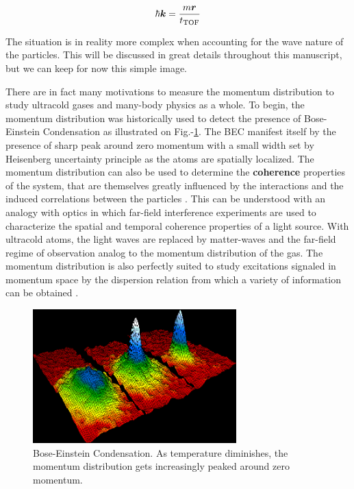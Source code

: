 \begin{equation}
    \hbar \bm{k} = \frac{m \bm{r}}{t_{\rm{TOF}}}
\end{equation}

\noindent The situation is in reality more complex when accounting for the wave nature of the particles. This will be discussed in great details throughout this manuscript, but we can keep for now this simple image.

There are in fact many motivations to measure the momentum distribution to study ultracold gases and many-body physics as a whole. To begin, the momentum distribution was historically \cite{anderson1995observation} used to detect the presence of Bose-Einstein Condensation as illustrated on Fig.-\ref{fig:1st_BEC}. The BEC manifest itself by the presence of sharp peak around zero momentum with a small width set by Heisenberg uncertainty principle as the atoms are spatially localized. The momentum distribution can also be used to determine the \textbf{coherence} properties of the system, that are themselves greatly influenced by the interactions and the induced correlations between the particles \cite{greiner2002quantum}. This can be understood with an analogy with optics in which far-field interference experiments are used to characterize the spatial and temporal coherence properties of a light source. With ultracold atoms, the light waves are replaced by matter-waves and the far-field regime of observation analog to the momentum distribution of the gas. The momentum distribution is also perfectly suited to study excitations signaled in momentum space by the dispersion relation from which a variety of information can be obtained \cite{clement2009exploring,ozeri2005colloquium,sagi2012measurement}.


\begin{figure}
    \centering
    \includegraphics[width=0.7\textwidth]{Fig/Intro/BEC.png}
    \caption[Momentum distribution across Bose-Einstein Condensation]{Bose-Einstein Condensation. As temperature diminishes, the momentum distribution gets increasingly peaked around zero momentum.}
    \label{fig:1st_BEC}
\end{figure}



